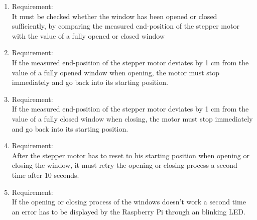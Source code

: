 \begin{enumerate}[label*=\arabic*.]
  	\begin{enumerate}[label*=\arabic*.]
			\item \label{req.4.1}  Requirement:  \\
            It must be checked whether the window has been opened or closed sufficiently, by comparing the measured end-position of the stepper motor with the value of a fully opened or closed window\\  
			\item \label{req.4.2}  Requirement:  \\
            If the measured end-position of the stepper motor deviates by 1 cm from the value of a fully opened window when opening, the motor must stop immediately and go back into its starting position.\\   
			\item \label{req.4.3}  Requirement:  \\
			If the measured end-position of the stepper motor deviates by 1 cm from the value of a fully closed window when closing, the motor must stop immediately and go back into its starting position.\\  
			\item \label{req.4.4}  Requirement:  \\
		      After the stepper motor has to reset to his starting position when opening or closing the window, it must retry the opening or closing process a second time after 10 seconds.\\  
			\item \label{req.4.5}  Requirement:  \\
			If the opening or closing process of the windows doesn't work a second time an error has to be displayed by the Raspberry Pi through an blinking LED.\\  
	  \end{enumerate}         
	\end{enumerate}


 

